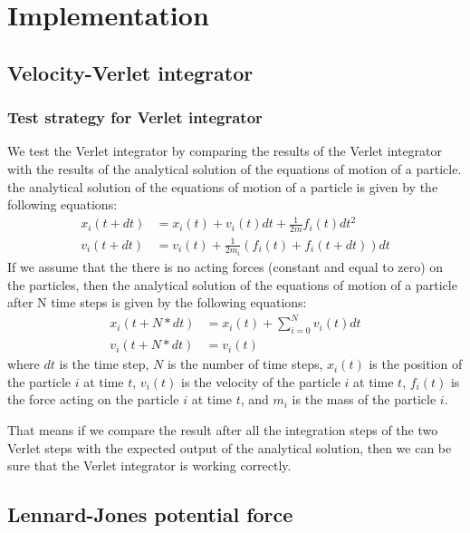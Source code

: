 \chapter{Implementation}\label{chap:Implementation}

\section{Velocity-Verlet integrator}
\subsection{Test strategy for Verlet integrator}
We test the Verlet integrator by comparing the results of the Verlet integrator with the results of the analytical solution of the equations of motion of a particle. the analytical solution of the equations of motion of a particle is given by the following equations:
\begin{equation}
\label{eq:analytical}
    \begin{aligned}
    x_i(t+dt) &= x_i(t) + v_i(t)dt + \frac{1}{2m}f_i(t)dt^2 \\
    v_i(t+dt) &= v_i(t) + \frac{1}{2m_i}(f_i(t)+f_i(t+dt))dt
    \end{aligned}
\end{equation}
If we assume that the there is no acting forces (constant and equal to zero) on the particles, then the analytical solution of the equations of motion of a particle after N time steps is given by the following equations:
\begin{equation}
\label{eq:analytical2}
    \begin{aligned}
    x_i(t+N*dt) &= x_i(t) + \sum_{i=0}^{N}v_i(t)dt \\
    v_i(t+N*dt) &= v_i(t)
    \end{aligned}
\end{equation}
where $dt$ is the time step, $N$ is the number of time steps, $x_i(t)$ is the position of the particle $i$ at time $t$, $v_i(t)$ is the velocity of the particle $i$ at time $t$, $f_i(t)$ is the force acting on the particle $i$ at time $t$, and $m_i$ is the mass of the particle $i$.

That means if we compare the result after all the integration steps of the two Verlet steps with the expected output of the analytical solution, then we can be sure that the Verlet integrator is working correctly.

\section{Lennard-Jones potential force}
